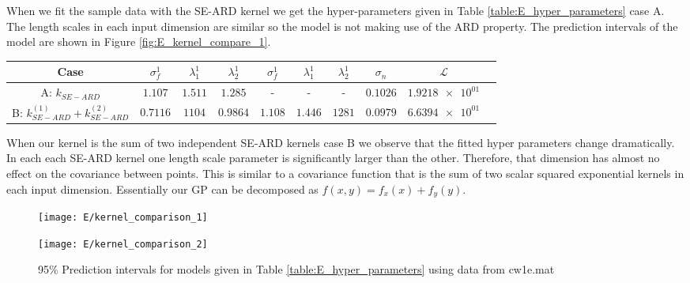 \documentclass[11pt]{article}
\newcommand{\Lik}{\mathcal{L}}
\begin{document}
When we fit the sample data with the SE-ARD kernel we get the hyper-parameters given in Table \ref{table:E_hyper_parameters} case A. The length scales in each input dimension are similar so the model is not making use of the ARD property. The prediction intervals of the model are shown in Figure \ref{fig:E_kernel_compare_1}. 

\begin{table*}[h]
    \centering
    \small
    \begin{tabular}{|c|c|c|c|c|c|c|c|c|c|}
        \hline
        Case & $\sigma_f^1$ & $\lambda_1^1$ & $\lambda_2^1$ & $\sigma_f^1$ & $\lambda_1^1$ & $\lambda_2^1$ & $\sigma_n$ & $\Lik$ \\
        \hline
        A: $k_{SE-ARD}$ & $1.107$ & $1.511$ & $1.285$ & - & - & - & $0.1026$ & $\num{1.9218e+01}$ \\ 
        B: $k_{SE-ARD}^{(1)} + k_{SE-ARD}^{(2)}$ & $0.7116$ & $1104$ & $0.9864$ & $1.108$ & $1.446$ & $1281$ & $0.0979$ & $\num{6.6394e+01}$ \\
        \hline
    \end{tabular}
    \caption{Hyper-parameter values for periodic SE covariance function}
    \label{table:E_hyper_parameters}
\end{table*}

When our kernel is the sum of two independent SE-ARD kernels case B we observe that the fitted hyper parameters change dramatically. In each each SE-ARD kernel one length scale parameter is significantly larger than the other. Therefore, that dimension has almost no effect on the covariance between points. This is similar to a covariance function that is the sum of two scalar squared exponential kernels in each input dimension. Essentially our GP can be decomposed as $f(x,y) = f_x(x) + f_y(y)$. 

\begin{figure}[h]
    \centering
    \begin{minipage}{0.45\textwidth}
        \centering
        \texttt{[image: E/kernel\_comparison\_1]} 
        \label{fig:E_kernel_compare_1}
    \end{minipage}
    \begin{minipage}{0.45\textwidth}
        \centering
        \texttt{[image: E/kernel\_comparison\_2]} 
        \label{fig:E_kernel_compare_2}
    \end{minipage}
    \caption{95\% Prediction intervals for models given in Table \ref{table:E_hyper_parameters} using data from cw1e.mat}
    \label{fig:E_kernel_compare}
\end{figure}
\end{document}
